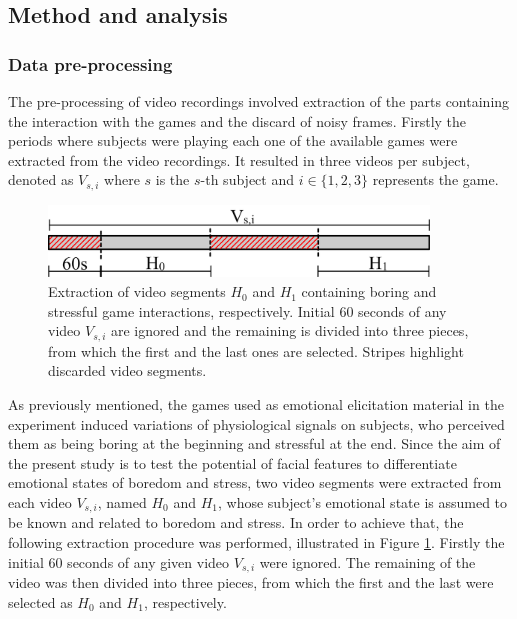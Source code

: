 \subsection{Method and analysis}
\label{s:experiment1-study5-method}

\subsubsection{Data pre-processing}

The pre-processing of video recordings involved extraction of the parts containing the interaction with the games and the discard of noisy frames. Firstly the periods where subjects were playing each one of the available games were extracted from the video recordings. It resulted in three videos per subject, denoted as $V_{s,i}$ where $s$ is the $s$-th subject and $i \in \{1, 2, 3\}$ represents the game.

\begin{figure}
\centering
\includegraphics[width=0.9\textwidth]{figures/pre-processing}
\caption{Extraction of video segments $H_0$ and $H_1$ containing boring and stressful game interactions, respectively. Initial 60 seconds of any video $V_{s,i}$ are ignored and the remaining is divided into three pieces, from which the first and the last ones are selected. Stripes highlight discarded video segments.}
\label{fig:preprocessing}
\end{figure}

As previously mentioned, the games used as emotional elicitation material in the experiment induced variations of physiological signals on subjects, who perceived them as being boring at the beginning and stressful at the end. Since the aim of the present study is to test the potential of facial features to differentiate emotional states of boredom and stress, two video segments were extracted from each video $V_{s,i}$, named $H_0$ and $H_1$, whose subject's emotional state is assumed to be known and related to boredom and stress. In order to achieve that, the following extraction procedure was performed, illustrated in Figure \ref{fig:preprocessing}. Firstly the initial 60 seconds of any given video $V_{s,i}$ were ignored. The remaining of the video was then divided into three pieces, from which the first and the last were selected as $H_0$ and $H_1$, respectively.

